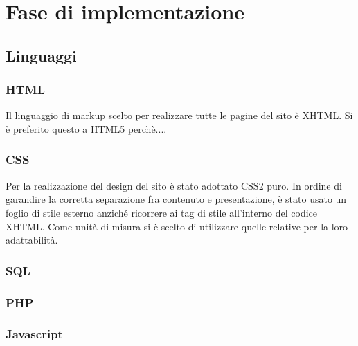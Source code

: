 \section{Fase di implementazione}
\subsection{Linguaggi}
\subsubsection{HTML}
Il linguaggio di markup scelto per realizzare tutte le pagine del sito è XHTML. Si è preferito questo a HTML5 perchè....
\subsubsection{CSS}
Per la realizzazione del design del sito è stato adottato CSS2 puro. In ordine di garandire la corretta separazione fra contenuto e presentazione, è stato usato un foglio di stile esterno anziché ricorrere ai tag di stile all'interno del codice XHTML. Come unità di misura si è scelto di utilizzare quelle relative per la loro adattabilità.
\subsubsection{SQL}
\subsubsection{PHP}
\subsubsection{Javascript}
